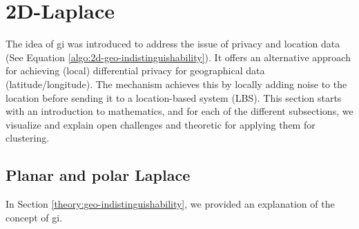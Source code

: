 %

\newpage
\section{2D-Laplace}
The idea of \gls{gi} was introduced to address the issue of privacy and location data \citep{DBLP:journals/corr/abs-1212-1984} (See Equation \ref{algo:2d-geo-indistinguishability}).
It offers an alternative approach for achieving (local) differential privacy for geographical data (latitude/longitude).
The mechanism achieves this by locally adding noise to the location before sending it to a location-based system (LBS).
This section starts with an introduction to mathematics, and for each of the different subsections, we visualize and explain open challenges and theoretic for applying them for clustering.
\subsection{Planar and polar Laplace}
In Section \ref{theory:geo-indistinguishability}, we provided an explanation of the concept of \gls{gi}. 

